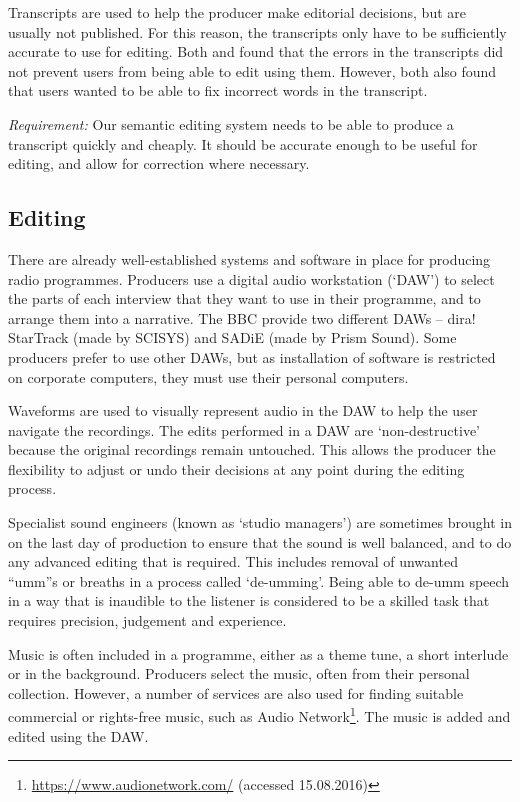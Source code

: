 Transcripts are used to help the producer make editorial decisions, but are usually not published. For this reason, the
transcripts only have to be sufficiently accurate to use for editing. Both \citet{Whittaker2004} and
\citet{Sivaraman2016} found that the errors in the transcripts did not prevent users from being able to edit using
them. However, both also found that users wanted to be able to fix incorrect words in the transcript.

\textit{Requirement:} Our semantic editing system needs to be able to produce a transcript quickly and cheaply. It
should be accurate enough to be useful for editing, and allow for correction where necessary.

\subsection{Editing}
There are already well-established systems and software in place for producing radio programmes. Producers use a
digital audio workstation (`DAW') to select the parts of each interview that they want to use in their programme, and
to arrange them into a narrative. The BBC provide two different DAWs -- dira!  StarTrack (made by SCISYS) and SADiE
(made by Prism Sound). Some producers prefer to use other DAWs, but as installation of software is restricted on
corporate computers, they must use their personal computers.

Waveforms are used to visually represent audio in the DAW to help the user navigate the recordings. The edits performed
in a DAW are `non-destructive' because the original recordings remain untouched. This allows the producer the
flexibility to adjust or undo their decisions at any point during the editing process.

Specialist sound engineers (known as `studio managers') are sometimes brought in on the last day of production to
ensure that the sound is well balanced, and to do any advanced editing that is required. This includes removal of
unwanted ``umm''s or breaths in a process called `de-umming'. Being able to de-umm speech in a way that is inaudible to
the listener is considered to be a skilled task that requires precision, judgement and experience.

Music is often included in a programme, either as a theme tune, a short interlude or in the background. Producers
select the music, often from their personal collection. However, a number of services are also used for finding
suitable commercial or rights-free music, such as Audio Network\footnote{\url{https://www.audionetwork.com/} (accessed
15.08.2016)}.  The music is added and edited using the DAW.

